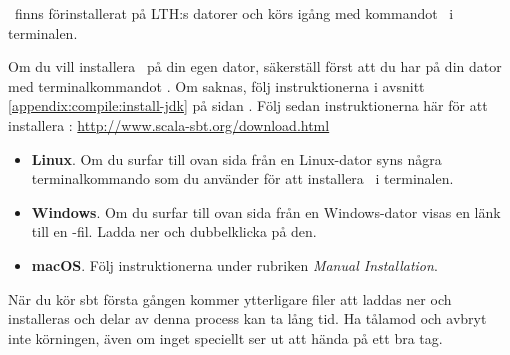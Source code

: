 \sbt\ finns förinstallerat på LTH:s datorer och körs igång med kommandot \sbt\ i terminalen.

Om du vill installera \sbt\ på din egen dator,
säkerställ först att du har  på din dator med terminalkommandot . Om  saknas, följ instruktionerna i avsnitt \ref{appendix:compile:install-jdk} på sidan \pageref{appendix:compile:install-jdk}.
Följ sedan instruktionerna här för att installera \sbt: \url{http://www.scala-sbt.org/download.html}

\begin{itemize}

\item \textbf{Linux}. Om du surfar till ovan sida från en Linux-dator syns några terminalkommando som du använder för att installera \sbt\ i terminalen.

\item \textbf{Windows}. Om du surfar till ovan sida från en Windows-dator visas en länk till en -fil. Ladda ner och dubbelklicka på den.

\item \textbf{macOS}. Följ instruktionerna under rubriken \textit{Manual Installation}.

\end{itemize}

\noindent När du kör sbt första gången kommer ytterligare filer att laddas ner och installeras och delar av denna process kan ta lång tid. Ha tålamod och avbryt inte körningen, även om inget speciellt ser ut att hända på ett bra tag.

%
%


